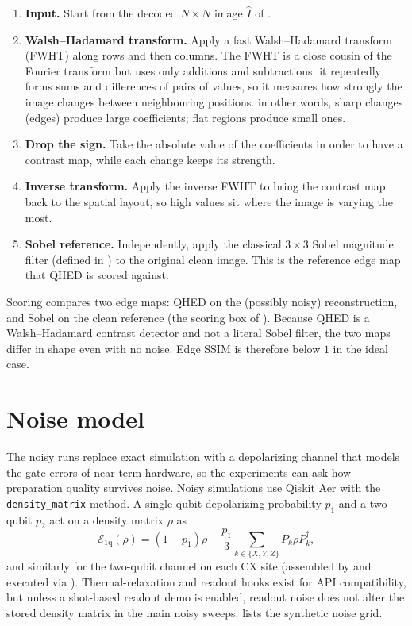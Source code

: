 \begin{enumerate}[label=\textbf{\arabic*.}, leftmargin=*]
  \item \textbf{Input.} Start from the decoded $N\times N$ image $\hat{I}$ of .
  \item \textbf{Walsh--Hadamard transform.} Apply a fast Walsh--Hadamard transform (FWHT) along rows and then columns. The FWHT is a close cousin of the Fourier transform but uses only additions and subtractions: it repeatedly forms sums and differences of pairs of values, so it measures how strongly the image changes between neighbouring positions. in other words, sharp changes (edges) produce large coefficients; flat regions produce small ones.
  \item \textbf{Drop the sign.} Take the absolute value of the coefficients in order to have a contrast map, while each change keeps its strength.
  \item \textbf{Inverse transform.} Apply the inverse FWHT to bring the contrast map back to the spatial layout, so high values sit where the image is varying the most.
  \item \textbf{Sobel reference.} Independently, apply the classical $3\times 3$ Sobel magnitude filter (defined in ) to the original clean image. This is the reference edge map that QHED is scored against.
\end{enumerate}

Scoring compares two edge maps: QHED on the (possibly noisy) reconstruction, and Sobel on the clean reference (the scoring box of ). Because QHED is a Walsh--Hadamard contrast detector and not a literal Sobel filter, the two maps differ in shape even with no noise. Edge SSIM is therefore below $1$ in the ideal case.

\section{Noise model}
The noisy runs replace exact simulation with a depolarizing channel that models the gate errors of near-term hardware, so the experiments can ask how preparation quality survives noise. Noisy simulations use Qiskit Aer with the \texttt{density\_matrix} method. A single-qubit depolarizing probability $p_1$ and a two-qubit $p_2$ act on a density matrix $\rho$ as
\begin{equation}
\mathcal{E}_{\mathrm{1q}}(\rho) = (1-p_1)\rho + \frac{p_1}{3}\sum_{k\in\{X,Y,Z\}} P_k \rho P_k^\dagger ,
\end{equation}
and similarly for the two-qubit channel on each CX site (assembled by  and executed via ). Thermal-relaxation and readout hooks exist for API compatibility, but unless a shot-based readout demo is enabled, readout noise does not alter the stored density matrix in the main noisy sweeps.  lists the synthetic noise grid.

